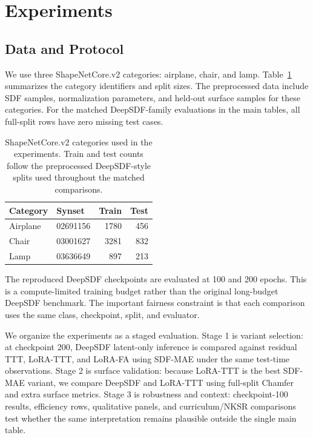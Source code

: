 \documentclass[letterpaper]{article}
\begin{document}
\section{Experiments}

\subsection{Data and Protocol}

We use three ShapeNetCore.v2 \cite{shapenet} categories: airplane, chair, and lamp. Table~\ref{tab:data} summarizes the category identifiers and split sizes. The preprocessed data include SDF samples, normalization parameters, and held-out surface samples for these categories. For the matched DeepSDF-family evaluations in the main tables, all full-split rows have zero missing test cases.

\begin{table}[t]
\centering
\begin{small}
\begin{tabular}{llrr}
\hline
Category & Synset & Train & Test \\
\hline
Airplane & 02691156 & 1780 & 456 \\
Chair & 03001627 & 3281 & 832 \\
Lamp & 03636649 & 897 & 213 \\
\hline
\end{tabular}
\end{small}
\caption{ShapeNetCore.v2 categories used in the experiments. Train and test counts follow the preprocessed DeepSDF-style splits used throughout the matched comparisons.}
\label{tab:data}
\end{table}

The reproduced DeepSDF checkpoints are evaluated at 100 and 200 epochs. This is a compute-limited training budget rather than the original long-budget DeepSDF benchmark. The important fairness constraint is that each comparison uses the same class, checkpoint, split, and evaluator.

We organize the experiments as a staged evaluation. Stage 1 is variant selection: at checkpoint 200, DeepSDF latent-only inference is compared against residual TTT, LoRA-TTT, and LoRA-FA using SDF-MAE under the same test-time observations. Stage 2 is surface validation: because LoRA-TTT is the best SDF-MAE variant, we compare DeepSDF and LoRA-TTT using full-split Chamfer and extra surface metrics. Stage 3 is robustness and context: checkpoint-100 results, efficiency rows, qualitative panels, and curriculum/NKSR comparisons test whether the same interpretation remains plausible outside the single main table.
\end{document}

